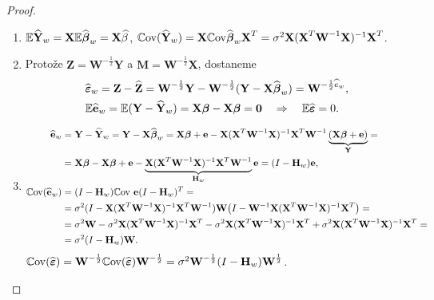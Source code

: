 \begin{theorem}
\begin{proof}
\begin{enumerate}[1)]
		\item $\mathbb{E} \widehat{\textbf{Y}}_w=\textbf{X}\mathbb{E} \widehat{\boldsymbol{\beta}}_w=\textbf{X}\widehat{\beta}$, $\mathbb{C}\mathrm{ov}(\widehat{\textbf{Y}}_w)=\textbf{X}\mathbb{C}\mathrm{ov}\widehat{\boldsymbol{\beta}}_w \textbf{X}^T=\sigma^2\textbf{X}{(\textbf{X}^T{\textbf{W}^{-1}}\textbf{X})^{-1}}\textbf{X}^T$.
		\item Protože $\textbf{Z}=\textbf{W}^{-\frac{1}{2}}\textbf{Y}$ a $\textbf{M}=\textbf{W}^{-\frac{1}{2}}\textbf{X}$, dostaneme 
		\[
		\begin{split}
		& \widehat{\boldsymbol{\varepsilon}}_w=\textbf{Z}-\widehat{\textbf{Z}}=\textbf{W}^{-\frac{1}{2}}\textbf{Y}-\textbf{W}^{-\frac{1}{2}}(\textbf{Y}-\textbf{X}\widehat{\boldsymbol{\beta}}_w)=\textbf{W}^{-\frac{1}{2}\widehat{e}_w},\\
		& \mathbb{E} \widehat{\textbf{e}}_w=\mathbb{E}(\textbf{Y}-\widehat{\textbf{Y}}_w)=\textbf{X}\boldsymbol{\beta}-\textbf{X}\boldsymbol{\beta}=\textbf{0}\quad\Rightarrow\quad \mathbb{E} \widehat{\boldsymbol{\varepsilon}}=0.
		\end{split}
		\]
		\item \[
		\begin{split}
		\widehat{\textbf{e}}_w&=\textbf{Y}-\widehat{\textbf{Y}}_w=\textbf{Y}-\textbf{X}\widehat{\boldsymbol{\beta}}_w=\textbf{X}\boldsymbol{\beta}+\textbf{e}-\textbf{X}{(\textbf{X}^T{\textbf{W}^{-1}}\textbf{X})^{-1}}\textbf{X}^T{\textbf{W}^{-1}}\underbrace{(\textbf{X}\boldsymbol{\beta}+\textbf{e})}_{\textbf{Y}}=\\&=\textbf{X}\boldsymbol{\beta}-\textbf{X}\boldsymbol{\beta}+\textbf{e}-\underbrace{\textbf{X}{(\textbf{X}^T{\textbf{W}^{-1}}\textbf{X})^{-1}}\textbf{X}^T{\textbf{W}^{-1}}}_{\textbf{H}_w}\textbf{e}=(I-\textbf{H}_w)\textbf{e},\\
		\mathbb{C}\mathrm{ov}(\widehat{\textbf{e}}_w)&=(I-\textbf{H}_w)\mathbb{C}\mathrm{ov}~ \textbf{e}(I-\textbf{H}_w)^T=\\&=\sigma^2(I-\textbf{X}{(\textbf{X}^T{\textbf{W}^{-1}}\textbf{X})^{-1}}\textbf{X}^T{\textbf{W}^{-1}})\textbf{W}\big(I-{\textbf{W}^{-1}}\textbf{X}{(\textbf{X}^T{\textbf{W}^{-1}}\textbf{X})^{-1}}\textbf{X}^T\big)=\\&=\sigma^2\textbf{W}-\sigma^2\textbf{X}{(\textbf{X}^T{\textbf{W}^{-1}}\textbf{X})^{-1}}\textbf{X}^T-\sigma^2\textbf{X}{(\textbf{X}^T{\textbf{W}^{-1}}\textbf{X})^{-1}}\textbf{X}^T
+\sigma^2\textbf{X}{(\textbf{X}^T{\textbf{W}^{-1}}\textbf{X})^{-1}}\textbf{X}^T=\\&=\sigma^2(I-\textbf{H}_w)\textbf{W}.	\end{split}
		\]
		$\mathbb{C}\mathrm{ov}(\widehat{\boldsymbol{\varepsilon}})=\textbf{W}^{-\frac{1}{2}}\mathbb{C}\mathrm{ov}(\widehat{\boldsymbol{\varepsilon}})\textbf{W}^{-\frac{1}{2}}=\sigma^2\textbf{W}^{-\frac{1}{2}}(I-\textbf{H}_w)\textbf{W}^{\frac{1}{2}}$.
	\end{enumerate}
\end{proof}
\end{theorem}
